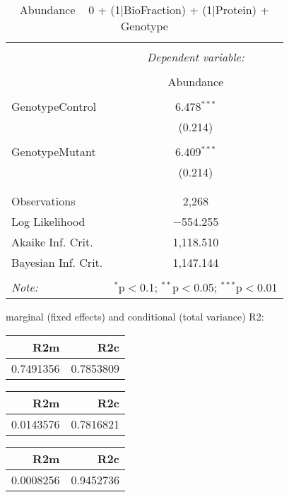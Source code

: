 \documentclass[11pt]{report}
\begin{document}
\begin{table}[!htbp] \centering 
  \caption{Abundance ~ 0 + (1|BioFraction) + (1|Protein) + Genotype} 
  \label{} 
\begin{tabular}{@{\extracolsep{5pt}}lc} 
\\[-1.8ex]\hline 
\hline \\[-1.8ex] 
 & \multicolumn{1}{c}{\textit{Dependent variable:}} \\ 
\cline{2-2} 
\\[-1.8ex] & Abundance \\ 
\hline \\[-1.8ex] 
 GenotypeControl & 6.478$^{***}$ \\ 
  & (0.214) \\ 
  & \\ 
 GenotypeMutant & 6.409$^{***}$ \\ 
  & (0.214) \\ 
  & \\ 
\hline \\[-1.8ex] 
Observations & 2,268 \\ 
Log Likelihood & $-$554.255 \\ 
Akaike Inf. Crit. & 1,118.510 \\ 
Bayesian Inf. Crit. & 1,147.144 \\ 
\hline 
\hline \\[-1.8ex] 
\textit{Note:}  & \multicolumn{1}{r}{$^{*}$p$<$0.1; $^{**}$p$<$0.05; $^{***}$p$<$0.01} \\ 
\end{tabular} 
\end{table} 
marginal (fixed effects) and conditional (total variance) R2:

\begin{tabular}{r|r}
\hline
R2m & R2c\\
\hline
0.7491356 & 0.7853809\\
\hline
\end{tabular}

\begin{tabular}{r|r}
\hline
R2m & R2c\\
\hline
0.0143576 & 0.7816821\\
\hline
\end{tabular}

\begin{tabular}{r|r}
\hline
R2m & R2c\\
\hline
0.0008256 & 0.9452736\\
\hline
\end{tabular}
\end{document}
